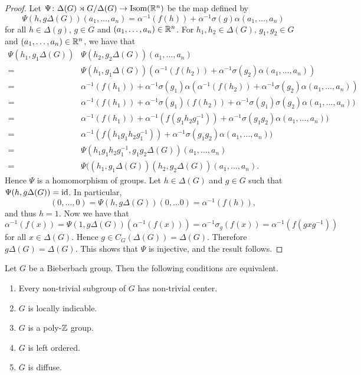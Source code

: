 \begin{proof}
Let $\Psi\colon \Delta(G)\rtimes G/\Delta(G)\to\operatorname{Isom}(\mathbb{R}^n)$ be the map defined by
\[ \Psi(h,g\Delta(G))(a_1,\dots ,a_n)=\alpha^{-1}(f(h))+\alpha^{-1}\sigma(g)\alpha(a_1,\dots ,a_n)\]
for all $h\in \Delta(g)$, $g\in G$ and $(a_1,\dots ,a_n)\in\mathbb{R}^n$. For $h_1,h_2\in \Delta(G)$, $g_1,g_2\in G$ and $(a_1,\dots ,a_n)\in \mathbb{R}^n$, we have that
\begin{align*}
    \Psi(h_1,g_1\Delta(G))&\Psi(h_2,g_2\Delta(G))(a_1,\dots ,a_n)\\
    =&\Psi(h_1,g_1\Delta(G))(\alpha^{-1}(f(h_2))+\alpha^{-1}\sigma(g_2)\alpha(a_1,\dots ,a_n))\\
    =&\alpha^{-1}(f(h_1))+\alpha^{-1}\sigma(g_1)\alpha(\alpha^{-1}(f(h_2))+\alpha^{-1}\sigma(g_2)\alpha(a_1,\dots ,a_n))\\
    =&\alpha^{-1}(f(h_1))+\alpha^{-1}\sigma(g_1)(f(h_2))+\alpha^{-1}\sigma(g_1)\sigma(g_2)\alpha(a_1,\dots ,a_n))\\
    =&\alpha^{-1}(f(h_1))+\alpha^{-1}(f(g_1h_2g_1^{-1}))+\alpha^{-1}\sigma(g_1g_2)\alpha(a_1,\dots ,a_n))\\
    =&\alpha^{-1}(f(h_1g_1h_2g_1^{-1}))+\alpha^{-1}\sigma(g_1g_2)\alpha(a_1,\dots ,a_n))\\
    =&\Psi(h_1g_1h_2g_1^{-1},g_1g_2\Delta(G))(a_1,\dots ,a_n)\\
    =&\Psi((h_1,g_1\Delta(G))(h_2,g_2\Delta(G))(a_1,\dots ,a_n).
\end{align*}
Hence $\Psi$ is a homomorphism of groups. Let $h\in \Delta(G)$ and $g\in G$ such that $\Psi(h,g\Delta(G))=\operatorname{id}$. In particular,
\[ (0,\dots,0)=\Psi(h,g\Delta(G))(0,\dots 0)=\alpha^{-1}(f(h)),\]
and thus $h=1$. Now we have that
\[\alpha^{-1}(f(x))=\Psi(1,g\Delta(G))(\alpha^{-1}(f(x)))=\alpha^{-1}\sigma_g(f(x))=\alpha^{-1}(f(gxg^{-1}))\]
for all $x\in \Delta(G)$. Hence $g\in C_G(\Delta(G))=\Delta(G)$. Therefore $g\Delta(G)=\Delta(G)$.
This shows that $\Psi$ is injective, and the result follows.
\end{proof}

\begin{theorem}\label{thm:leftorderedBieberbach}
Let $G$ be a Bieberbach group. Then the following conditions are equivalent.
\begin{enumerate}
    \item Every non-trivial subgroup of $G$ has non-trivial center.
    \item $G$ is locally indicable.
    \item $G$ is a poly-$\mathbb{Z}$ group.
    \item $G$ is left ordered.
    \item $G$ is diffuse.
\end{enumerate}
\end{theorem}


